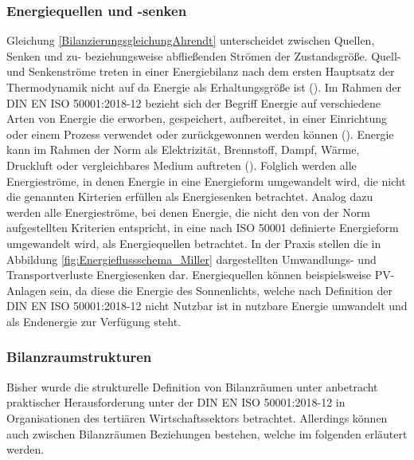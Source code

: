 
\subsubsection{Energiequellen und -senken}
Gleichung \eqref{BilanzierungsgleichungAhrendt} unterscheidet zwischen Quellen, Senken und zu- beziehungsweise abfließenden Strömen der Zustandsgröße. 
Quell- und Senkenströme treten in einer Energiebilanz nach dem ersten Hauptsatz der Thermodynamik nicht auf da Energie als Erhaltungsgröße ist (\cite[S. 14]{Ahrendts.2014}). 
Im Rahmen der DIN EN ISO 50001:2018-12 bezieht sich der Begriff Energie auf verschiedene Arten von Energie die erworben, gespeichert, aufbereitet, in einer Einrichtung oder einem Prozess verwendet 
oder zurückgewonnen werden können (\cite[Kapitel 3.5.1]{DIN50001.2018}). Energie kann im Rahmen der Norm als Elektrizität, Brennstoff, Dampf, Wärme, Druckluft oder vergleichbares Medium auftreten 
(\cite[Kapitel 3.5.1]{DIN50001.2018}).
Folglich werden alle Energieströme, in denen Energie in eine Energieform umgewandelt wird, die nicht die genannten Kirterien erfüllen als Energiesenken betrachtet. 
Analog dazu werden alle Energieströme, bei denen Energie, die nicht den von der Norm aufgestellten Kriterien entspricht, in eine nach ISO 50001 definierte Energieform 
umgewandelt wird, als Energiequellen betrachtet.
In der Praxis stellen die in Abbildung \eqref{fig:Energieflussschema_Miller} dargestellten Umwandlungs- und Transportverluste Energiesenken dar. Energiequellen können beispielsweise 
PV-Anlagen sein, da diese die Energie des Sonnenlichts, welche nach Definition der DIN EN ISO 50001:2018-12 nicht Nutzbar ist in nutzbare Energie umwandelt und als 
Endenergie zur Verfügung steht.

\subsubsection{Bilanzraumstrukturen}
Bisher wurde die strukturelle Definition von Bilanzräumen unter anbetracht praktischer Herausforderung unter der DIN EN ISO 50001:2018-12 in Organisationen 
des tertiären Wirtschaftssektors betrachtet. Allerdings können auch zwischen Bilanzräumen Beziehungen bestehen, welche im folgenden erläutert werden.


